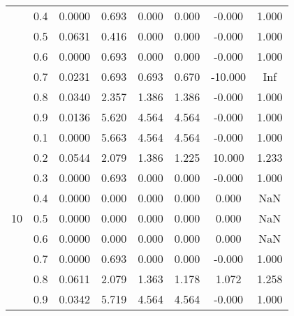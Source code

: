 \documentclass[11pt,a4paper]{report}
\begin{document}
\begin{longtable}{ | c | c || c | c | c | c | c | c | }
 & 0.4 & 0.0000 & 0.693 & 0.000 & 0.000 & -0.000 & 1.000 \\
 & 0.5 & 0.0631 & 0.416 & 0.000 & 0.000 & -0.000 & 1.000 \\
 & 0.6 & 0.0000 & 0.693 & 0.000 & 0.000 & -0.000 & 1.000 \\
 & 0.7 & 0.0231 & 0.693 & 0.693 & 0.670 & -10.000 & Inf \\
 & 0.8 & 0.0340 & 2.357 & 1.386 & 1.386 & -0.000 & 1.000 \\
 & 0.9 & 0.0136 & 5.620 & 4.564 & 4.564 & -0.000 & 1.000 \\
 \hline
\multirow{9}{*}{10} & 0.1 & 0.0000 & 5.663 & 4.564 & 4.564 & -0.000 & 1.000 \\
 & 0.2 & 0.0544 & 2.079 & 1.386 & 1.225 & 10.000 & 1.233 \\
 & 0.3 & 0.0000 & 0.693 & 0.000 & 0.000 & -0.000 & 1.000 \\
 & 0.4 & 0.0000 & 0.000 & 0.000 & 0.000 & 0.000 & NaN \\
 & 0.5 & 0.0000 & 0.000 & 0.000 & 0.000 & 0.000 & NaN \\
 & 0.6 & 0.0000 & 0.000 & 0.000 & 0.000 & 0.000 & NaN \\
 & 0.7 & 0.0000 & 0.693 & 0.000 & 0.000 & -0.000 & 1.000 \\
 & 0.8 & 0.0611 & 2.079 & 1.363 & 1.178 & 1.072 & 1.258 \\
 & 0.9 & 0.0342 & 5.719 & 4.564 & 4.564 & -0.000 & 1.000 \\
 \hline
\hline
\end{longtable}
\end{document}
